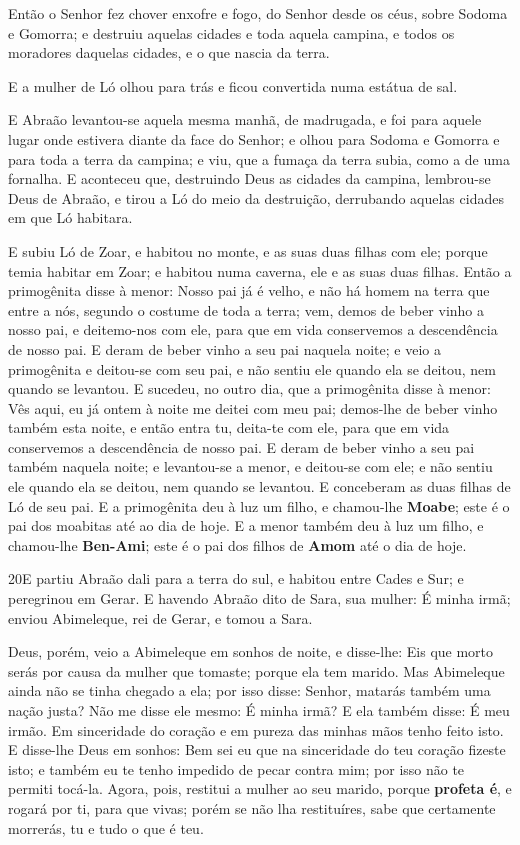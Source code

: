 Então o Senhor fez chover enxofre e fogo, do Senhor desde os
céus, sobre Sodoma e Gomorra; e destruiu aquelas cidades e
toda aquela campina, e todos os moradores daquelas cidades, e o que
nascia da terra.

E a mulher de Ló olhou para trás e ficou convertida numa estátua
de sal.

E Abraão levantou-se aquela mesma manhã, de madrugada, e foi para
aquele lugar onde estivera diante da face do Senhor; e olhou
para Sodoma e Gomorra e para toda a terra da campina; e viu, que a
fumaça da terra subia, como a de uma fornalha. E aconteceu
que, destruindo Deus as cidades da campina, lembrou-se Deus de
Abraão, e tirou a Ló do meio da destruição, derrubando aquelas
cidades em que Ló habitara.

E subiu Ló de Zoar, e habitou no monte, e as suas duas filhas com
ele; porque temia habitar em Zoar; e habitou numa caverna, ele e as
suas duas filhas. Então a primogênita disse à menor: Nosso
pai já é velho, e não há homem na terra que entre a nós, segundo o
costume de toda a terra; vem, demos de beber vinho a nosso
pai, e deitemo-nos com ele, para que em vida conservemos a
descendência de nosso pai. E deram de beber vinho a seu pai
naquela noite; e veio a primogênita e deitou-se com seu pai, e não
sentiu ele quando ela se deitou, nem quando se levantou. E
sucedeu, no outro dia, que a primogênita disse à menor: Vês aqui, eu
já ontem à noite me deitei com meu pai; demos-lhe de beber vinho
também esta noite, e então entra tu, deita-te com ele, para que em
vida conservemos a descendência de nosso pai. E deram de
beber vinho a seu pai também naquela noite; e levantou-se a menor, e
deitou-se com ele; e não sentiu ele quando ela se deitou, nem quando
se levantou. E conceberam as duas filhas de Ló de seu pai.
E a primogênita deu à luz um filho, e chamou-lhe
\textbf{Moabe}; este é o pai dos moabitas até ao dia de hoje.
E a menor também deu à luz um filho, e chamou-lhe
\textbf{Ben-Ami}; este é o pai dos filhos de \textbf{Amom} até o dia
de hoje.

\smallskip

\lettrine{20} E partiu Abraão dali para a terra do sul, e
habitou entre Cades e Sur; e peregrinou em Gerar. E havendo
Abraão dito de Sara, sua mulher: É minha irmã; enviou Abimeleque,
rei de Gerar, e tomou a Sara.

Deus, porém, veio a Abimeleque em sonhos de noite, e disse-lhe:
Eis que morto serás por causa da mulher que tomaste; porque ela tem
marido. Mas Abimeleque ainda não se tinha chegado a ela; por
isso disse: Senhor, matarás também uma nação justa? Não me disse
ele mesmo: É minha irmã? E ela também disse: É meu irmão. Em
sinceridade do coração e em pureza das minhas mãos tenho feito isto.
E disse-lhe Deus em sonhos: Bem sei eu que na sinceridade do teu
coração fizeste isto; e também eu te tenho impedido de pecar contra
mim; por isso não te permiti tocá-la. Agora, pois, restitui a
mulher ao seu marido, porque \textbf{profeta é}, e rogará por ti,
para que vivas; porém se não lha restituíres, sabe que certamente
morrerás, tu e tudo o que é teu.

